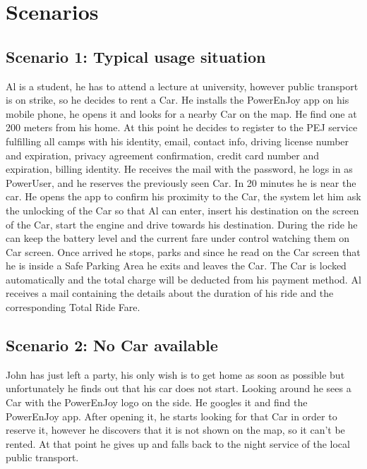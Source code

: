 \section{Scenarios}

\subsection{Scenario 1: Typical usage situation}
Al is a student, he has to attend a lecture at university, however public transport is on strike, so he decides to rent a Car.  He installs the PowerEnJoy app on his mobile phone, he opens it and looks for a nearby Car on the map. He find one at 200 meters from his home. At this point he decides to register to the PEJ service fulfilling all camps with his identity, email, contact info, driving license number and expiration, privacy agreement confirmation, credit card number and expiration, billing identity. He receives the mail with the password, he logs in as PowerUser, and he reserves the previously seen Car. In 20 minutes he is near the car. He opens the app to confirm his proximity to the Car, the system let him ask the unlocking of the Car so that Al can enter, insert his destination on the screen of the Car, start the engine and drive towards his destination. During the ride he can keep the battery level and the current fare under control watching them on Car screen. Once arrived he stops, parks and since he read on the Car screen that he is inside a Safe Parking Area he exits and leaves the Car. The Car is locked automatically and the total charge will be deducted from his payment method. Al receives a mail containing the details about the duration of his ride and the corresponding Total Ride Fare.

\subsection{Scenario 2: No Car available}
John has just left a party, his only wish is to get home as soon as possible but unfortunately he finds out that his car does not start. Looking around he sees a Car with the PowerEnJoy logo on the side. He googles it and find the PowerEnJoy app. After opening it, he starts looking for that Car in order to reserve it, however he discovers that it is not shown on the map, so it can't be rented. At that point he gives up and falls back to the night service of the local public transport.

